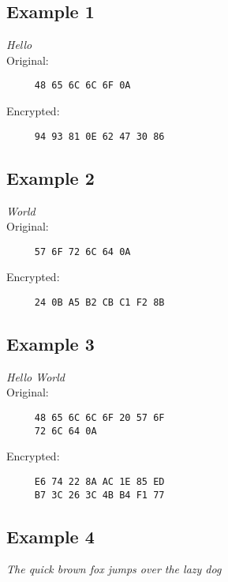 \documentclass[10pt]{article}
\begin{document}
\begin{multicols}{3}


  \subsection{Example 1}

  \textit{Hello} \\
\noindent Original:
  \begin{verbatim}
     48 65 6C 6C 6F 0A
  \end{verbatim}
  \indent Encrypted:
  \begin{verbatim}
     94 93 81 0E 62 47 30 86
  \end{verbatim}

  \subsection{Example 2}

  \textit{World} \\
\noindent Original:
  \begin{verbatim}
     57 6F 72 6C 64 0A
  \end{verbatim}
  \indent Encrypted:
  \begin{verbatim}
     24 0B A5 B2 CB C1 F2 8B
  \end{verbatim}

  \subsection{Example 3} 

  \textit{Hello World} \\
\noindent Original:
  \begin{verbatim}
     48 65 6C 6C 6F 20 57 6F
     72 6C 64 0A
  \end{verbatim}
  \indent Encrypted:
  \begin{verbatim}
     E6 74 22 8A AC 1E 85 ED
     B7 3C 26 3C 4B B4 F1 77
  \end{verbatim}

\end{multicols}

\subsection{Example 4}

\textit{The quick brown fox jumps over the lazy dog} \\
\end{document}
